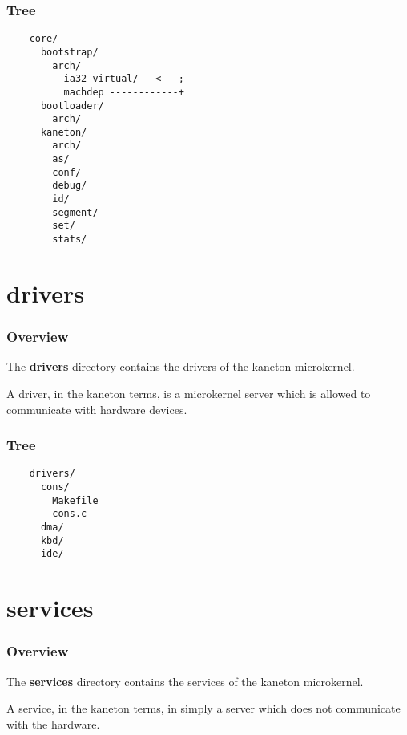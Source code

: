 
\begin{frame}[containsverbatim]
  \frametitle{Tree}

  \begin{verbatim}
    core/
      bootstrap/
        arch/
          ia32-virtual/   <---;
          machdep ------------+
      bootloader/
        arch/
      kaneton/
        arch/
        as/
        conf/
        debug/
        id/
        segment/
        set/
        stats/
  \end{verbatim}
\end{frame}

%
%

\section{drivers}


\begin{frame}
  \frametitle{Overview}

  The \textbf{drivers} directory contains the drivers of the kaneton
  microkernel.

  \nl

  A driver, in the kaneton terms, is a microkernel server which is allowed
  to communicate with hardware devices.
\end{frame}


\begin{frame}[containsverbatim]
  \frametitle{Tree}

  \begin{verbatim}
    drivers/
      cons/
        Makefile
        cons.c
      dma/
      kbd/
      ide/
  \end{verbatim}
\end{frame}

%
%

\section{services}


\begin{frame}
  \frametitle{Overview}

  The \textbf{services} directory contains the services of the kaneton
  microkernel.

  \nl

  A service, in the kaneton terms, in simply a server which does not
  communicate with the hardware.
\end{frame}


